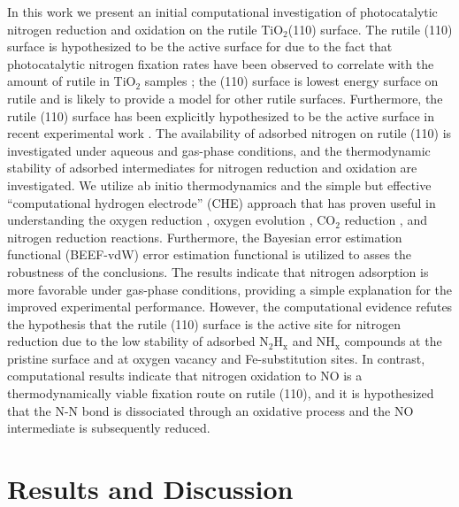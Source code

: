 \documentclass[journal=ascecg,manuscript=article,articletitle=true]{achemso}
\begin{document}
In this work we present an initial computational investigation of photocatalytic nitrogen reduction and oxidation on the rutile TiO$_2$(110) surface. The rutile (110) surface is hypothesized to be the active surface for due to the fact that photocatalytic nitrogen fixation rates have been observed to correlate with the amount of rutile in TiO$_2$ samples \cite{Schrauzer_2011}; the (110) surface is lowest energy surface on rutile and is likely to provide a model for other rutile surfaces. Furthermore, the rutile (110) surface has been explicitly hypothesized to be the active surface in recent experimental work \cite{Hirakawa_2017}. The availability of adsorbed nitrogen on rutile (110) is investigated under aqueous and gas-phase conditions, and the thermodynamic stability of adsorbed intermediates for nitrogen reduction and oxidation are investigated. We utilize ab initio thermodynamics \cite{Reuter_2001,Reuter_2005} and the simple but effective ``computational hydrogen electrode'' (CHE) approach \cite{Calle_Vallejo_2012} that has proven useful in understanding the oxygen reduction \cite{Norskov_2004}, oxygen evolution \cite{Man_2011}, CO$_2$ reduction \cite{Peterson_2010}, and nitrogen reduction \cite{Skulason_2012} reactions. Furthermore, the Bayesian error estimation functional (BEEF-vdW) error estimation functional is utilized to asses the robustness of the conclusions. The results indicate that nitrogen adsorption is more favorable under gas-phase conditions, providing a simple explanation for the improved experimental performance. However, the computational evidence refutes the hypothesis that the rutile (110) surface is the active site for nitrogen reduction due to the low stability of adsorbed N$_2$H$_{\mathrm{x}}$ and NH$_{\mathrm{x}}$ compounds at the pristine surface and at oxygen vacancy and Fe-substitution sites. In contrast, computational results indicate that nitrogen oxidation to NO is a thermodynamically viable fixation route on rutile (110), and it is hypothesized that the N-N bond is dissociated through an oxidative process and the NO intermediate is subsequently reduced.

\section{Results and Discussion}
\end{document}
